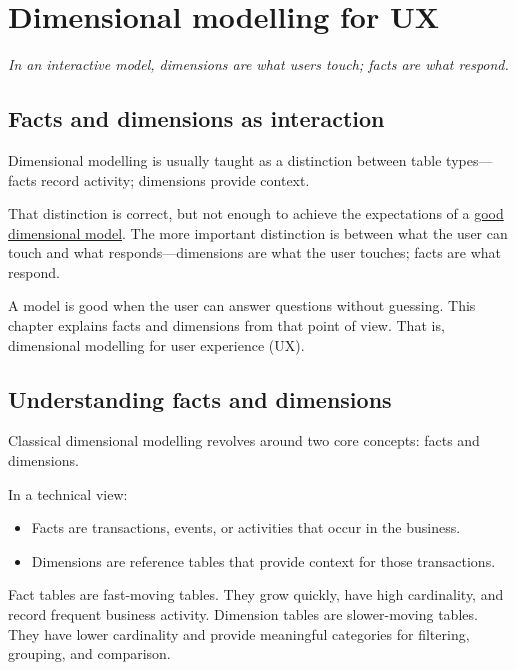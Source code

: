 \documentclass[10pt,openany,10pt]{book}
\providecommand{\tightlist}{%
  \setlength{\itemsep}{0pt}\setlength{\parskip}{0pt}}
\begin{document}
\chapter{Dimensional modelling for
UX}\label{docs-presenting-insights-dimensional-modelling-for-ux}

\emph{In an interactive model, dimensions are what users touch; facts
are what respond.}

\section{Facts and dimensions as
interaction}\label{facts-and-dimensions-as-interaction}

Dimensional modelling is usually taught as a distinction between table
types---facts record activity; dimensions provide context.

That distinction is correct, but not enough to achieve the expectations
of a \hyperref[docs-presenting-insights-a-good-dimensional-model]{good
dimensional model}. The more important distinction is between what the
user can touch and what responds---dimensions are what the user touches;
facts are what respond.

A model is good when the user can answer questions without guessing.
This chapter explains facts and dimensions from that point of view. That
is, dimensional modelling for user experience (UX).

\section{Understanding facts and
dimensions}\label{understanding-facts-and-dimensions}

Classical dimensional modelling revolves around two core concepts: facts
and dimensions.

In a technical view:

\begin{itemize}
\tightlist
\item
  Facts are transactions, events, or activities that occur in the
  business.
\item
  Dimensions are reference tables that provide context for those
  transactions.
\end{itemize}

Fact tables are fast-moving tables. They grow quickly, have high
cardinality, and record frequent business activity. Dimension tables are
slower-moving tables. They have lower cardinality and provide meaningful
categories for filtering, grouping, and comparison.
\end{document}
